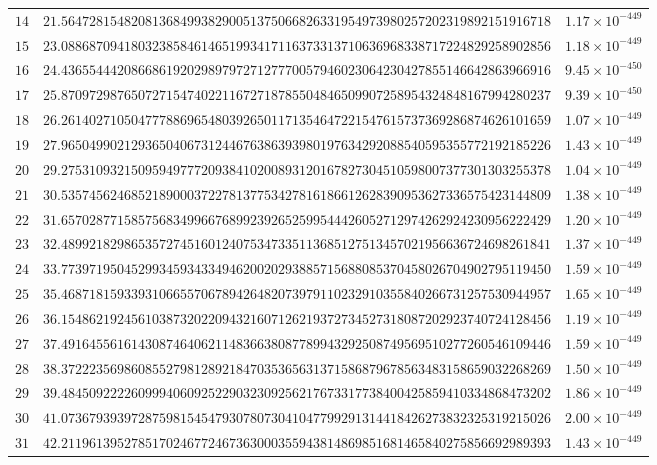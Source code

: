 \documentclass[12pt,reqno]{amsart}
\theoremstyle{remark}
\begin{document}
\begin{longtable}{clc}
$14$ & $21.5647281548208136849938290051375066826331954973980257202319892151916718$ & $1.17\times 10^{-449}$ \\
$15$ & $23.0886870941803238584614651993417116373313710636968338717224829258902856$ & $1.18\times 10^{-449}$ \\
$16$ & $24.4365544420866861920298979727127770057946023064230427855146642863966916$ & $9.45\times 10^{-450}$ \\
$17$ & $25.8709729876507271547402211672718785504846509907258954324848167994280237$ & $9.39\times 10^{-450}$ \\
$18$ & $26.2614027105047778869654803926501171354647221547615737369286874626101659$ & $1.07\times 10^{-449}$ \\
$19$ & $27.9650499021293650406731244676386393980197634292088540595355772192185226$ & $1.43\times 10^{-449}$ \\
$20$ & $29.2753109321509594977720938410200893120167827304510598007377301303255378$ & $1.04\times 10^{-449}$ \\
$21$ & $30.5357456246852189000372278137753427816186612628390953627336575423144809$ & $1.38\times 10^{-449}$ \\
$22$ & $31.6570287715857568349966768992392652599544426052712974262924230956222429$ & $1.20\times 10^{-449}$ \\
$23$ & $32.4899218298653572745160124075347335113685127513457021956636724698261841$ & $1.37\times 10^{-449}$ \\
$24$ & $33.7739719504529934593433494620020293885715688085370458026704902795119450$ & $1.59\times 10^{-449}$ \\
$25$ & $35.4687181593393106655706789426482073979110232910355840266731257530944957$ & $1.65\times 10^{-449}$ \\
$26$ & $36.1548621924561038732022094321607126219372734527318087202923740724128456$ & $1.19\times 10^{-449}$ \\
$27$ & $37.4916455616143087464062114836638087789943292508749569510277260546109446$ & $1.59\times 10^{-449}$ \\
$28$ & $38.3722235698608552798128921847035365631371586879678563483158659032268269$ & $1.50\times 10^{-449}$ \\
$29$ & $39.4845092222609994060925229032309256217673317738400425859410334868473202$ & $1.86\times 10^{-449}$ \\
$30$ & $41.0736793939728759815454793078073041047799291314418426273832325319215026$ & $2.00\times 10^{-449}$ \\
$31$ & $42.2119613952785170246772467363000355943814869851681465840275856692989393$ & $1.43\times 10^{-449}$ \\

\end{longtable}
\end{document}
